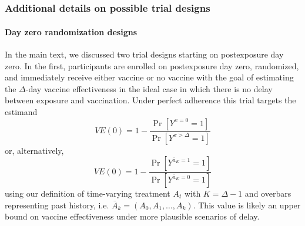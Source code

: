 \renewcommand{\appendixpagename}{\vspace*{\fill}\centering \textit{Web Appendix:} Emulating target trials of postexposure vaccines using observational data\vspace*{\fill} } %

\begin{appendices}

    \renewcommand{\thesection}{Web Appendix \arabic{section}}
    \renewcommand{\thesubsection}{WA\arabic{section}.\arabic{subsection}}

    \renewcommand{\thefigure}{A\arabic{figure}}
    \setcounter{figure}{0}
    
    \renewcommand{\thetable}{A\arabic{table}}
    \setcounter{table}{0}
    
    \renewcommand{\theequation}{A\arabic{equation}}
    \setcounter{equation}{0}

    \newpage
    \part{ } %
    \parttoc %
    \newpage

    \begin{refsection}  
    \section{Additional details on possible trial designs} \label{sec:additional_design}
    \subsection{Day zero randomization designs} \label{sec:dayzero}
    In the main text, we discussed two trial designs starting on postexposure day zero. In the first, participants are enrolled on postexposure day zero, randomized, and immediately receive either vaccine or no vaccine with the goal of estimating the $\Delta$-day vaccine effectiveness in the ideal case in which there is no delay between exposure and vaccination. Under perfect adherence this trial targets the estimand
    $$VE(0) = 1 - \dfrac{\Pr[Y^{x = 0} = 1]}{\Pr[Y^{x > \Delta} = 1]}$$
    or, alternatively,
    $$VE(0) = 1 - \dfrac{\Pr[Y^{\overline{a}_{K} = 1} = 1]}{\Pr[Y^{\overline{a}_{K} = 0} = 1]}$$
    using our definition of time-varying treatment $A_t$ with $K = \Delta - 1$ and overbars representing past history, i.e. $\overline{A}_k = (A_0, A_1, \ldots, A_k)$. This value is likely an upper bound on vaccine effectiveness under more plausible scenarios of delay.


\end{refsection}
\end{appendices}
